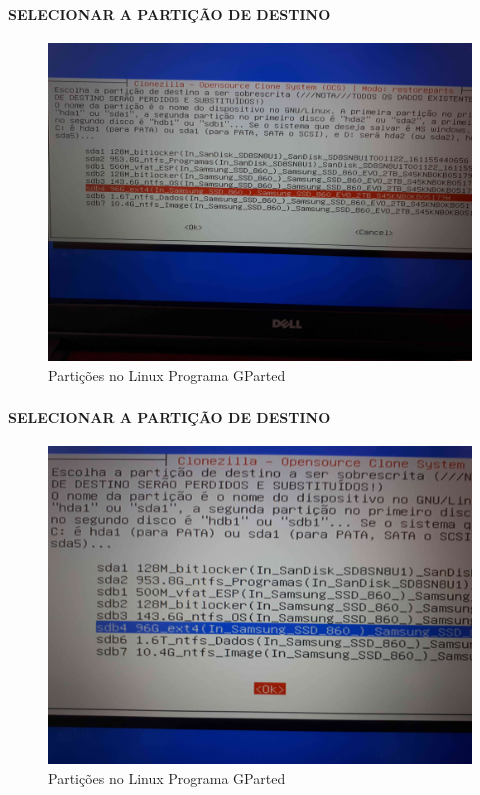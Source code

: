 \documentclass{beamer}
\begin{document}
\begin{frame}[plain,c]
   \frametitle{\insertsection}
    \framesubtitle{SELECIONAR A PARTIÇÃO DE DESTINO}
    \begin{figure}[!h]
        \includegraphics[width=1\linewidth]{images/rest/res12.jpg}
        \caption{Partições no Linux Programa GParted}
    \end{figure}
\end{frame}	

\begin{frame}[plain,c]
   \frametitle{\insertsection}
    \framesubtitle{SELECIONAR A PARTIÇÃO DE DESTINO}
    \begin{figure}[!h]
        \includegraphics[width=1\linewidth]{images/rest/res13.jpg}
        \caption{Partições no Linux Programa GParted}
    \end{figure}
\end{frame}	
\end{document}
